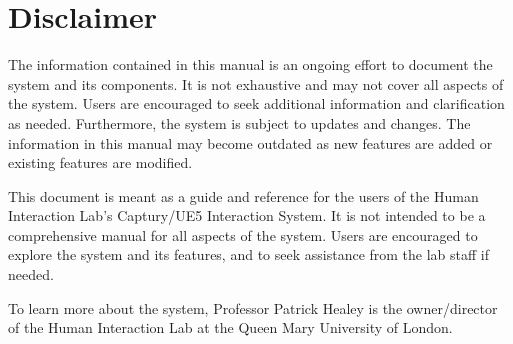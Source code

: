 \section{Disclaimer}
The information contained in this manual is an ongoing effort to document the system and its components. It is not exhaustive and may not cover all aspects of the system. Users are encouraged to seek additional information and clarification as needed. Furthermore, the system is subject to updates and changes. The information in this manual may become outdated as new features are added or existing features are modified. 

This document is meant as a guide and reference for the users of the Human Interaction Lab's Captury/UE5 Interaction System. It is not intended to be a comprehensive manual for all aspects of the system. Users are encouraged to explore the system and its features, and to seek assistance from the lab staff if needed.

To learn more about the system, Professor Patrick Healey is the owner/director of the Human Interaction Lab at the Queen Mary University of London.

